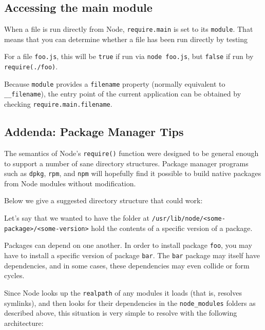 \subsection{Accessing the main module}\label{accessing-the-main-module}

When a file is run directly from Node, \texttt{require.main} is set to
its \texttt{module}. That means that you can determine whether a file
has been run directly by testing

\begin{Shaded}
\begin{Highlighting}[]
 
\end{Highlighting}
\end{Shaded}

For a file \texttt{foo.js}, this will be \texttt{true} if run via
\texttt{node\ foo.js}, but \texttt{false} if run by
\texttt{require(\textquotesingle{}./foo\textquotesingle{})}.

Because \texttt{module} provides a \texttt{filename} property (normally
equivalent to \texttt{\_\_filename}), the entry point of the current
application can be obtained by checking \texttt{require.main.filename}.

\subsection{Addenda: Package Manager
Tips}\label{addenda-package-manager-tips}

The semantics of Node's \texttt{require()} function were designed to be
general enough to support a number of sane directory structures. Package
manager programs such as \texttt{dpkg}, \texttt{rpm}, and \texttt{npm}
will hopefully find it possible to build native packages from Node
modules without modification.

Below we give a suggested directory structure that could work:

Let's say that we wanted to have the folder at
\texttt{/usr/lib/node/\textless{}some-package\textgreater{}/\textless{}some-version\textgreater{}}
hold the contents of a specific version of a package.

Packages can depend on one another. In order to install package
\texttt{foo}, you may have to install a specific version of package
\texttt{bar}. The \texttt{bar} package may itself have dependencies, and
in some cases, these dependencies may even collide or form cycles.

Since Node looks up the \texttt{realpath} of any modules it loads (that
is, resolves symlinks), and then looks for their dependencies in the
\texttt{node\_modules} folders as described above, this situation is
very simple to resolve with the following architecture:

